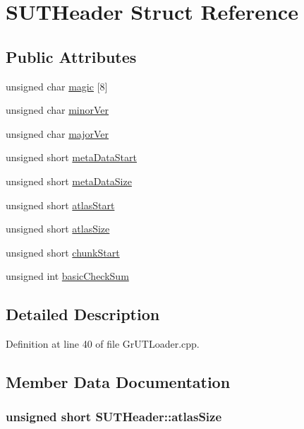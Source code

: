 \hypertarget{struct_s_u_t_header}{
\section{SUTHeader Struct Reference}
\label{struct_s_u_t_header}
}
\subsection*{Public Attributes}
\begin{CompactItemize}
\item 
unsigned char \hyperlink{struct_s_u_t_header_4b17f37b5ec2b84cd7e556e1db1526fd}{magic} \mbox{[}8\mbox{]}
\item 
unsigned char \hyperlink{struct_s_u_t_header_972e18afc8d7c6b0f613c15c874b409e}{minorVer}
\item 
unsigned char \hyperlink{struct_s_u_t_header_d52c5e749973c73c642fb84681920831}{majorVer}
\item 
unsigned short \hyperlink{struct_s_u_t_header_4dd77cccfd65e78c6f9e151b2c45d885}{metaDataStart}
\item 
unsigned short \hyperlink{struct_s_u_t_header_8a505fd64fc60eeaff34a5c624ab1568}{metaDataSize}
\item 
unsigned short \hyperlink{struct_s_u_t_header_9e7bd76e03d33e6c3abf8bb8dfff7114}{atlasStart}
\item 
unsigned short \hyperlink{struct_s_u_t_header_f8d6e268331abd330f1b8a64eb3a6d18}{atlasSize}
\item 
unsigned short \hyperlink{struct_s_u_t_header_e3658a7f87cd2bab631d25a256ca5d69}{chunkStart}
\item 
unsigned int \hyperlink{struct_s_u_t_header_a2005bd7672275f54997ef96dfc69b58}{basicCheckSum}
\end{CompactItemize}


\subsection{Detailed Description}


Definition at line 40 of file GrUTLoader.cpp.

\subsection{Member Data Documentation}
\hypertarget{struct_s_u_t_header_f8d6e268331abd330f1b8a64eb3a6d18}{
\subsubsection[{atlasSize}]{\setlength{\rightskip}{0pt plus 5cm}unsigned short {\bf SUTHeader::atlasSize}}}
\label{struct_s_u_t_header_f8d6e268331abd330f1b8a64eb3a6d18}




